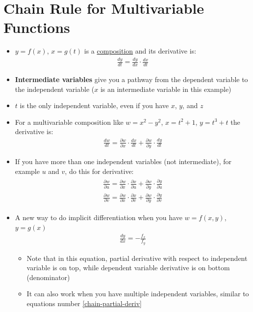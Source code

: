\documentclass{article}
\begin{document}
\section{Chain Rule for Multivariable Functions}
\begin{itemize}
  \item $y = f(x)$, $x = g(t)$ is a \underline{composition} and its derivative is:
  \begin{align}
    \frac{dy}{dt} = \frac{dy}{dx}\cdot\frac{dx}{dt}
  \end{align}
  \item \textbf{Intermediate variables} give you a pathway from the dependent variable to the independent variable ($x$ is an intermediate variable in this example)
  \item $t$ is the only independent variable, even if you have $x$, $y$, and $z$
  \item For a multivariable composition like $w = x^2 - y^2$, $x = t^2 + 1$, $y = t^3 + t$ the derivative is:
    \begin{align}
      \frac{dw}{dt} = \frac{\partial w}{\partial x}\cdot\frac{dx}{dt} + \frac{\partial w}{\partial y}\cdot\frac{dy}{dt}
    \end{align}
  \item If you have more than one independent variables (not intermediate), for example $u$ and $v$, do this for derivative:
  \begin{align}
    \begin{split}
      \frac{\partial w}{\partial u} = \frac{\partial w}{\partial x}\cdot\frac{\partial x}{\partial u} + \frac{\partial w}{\partial y}\cdot\frac{\partial y}{\partial u} \\
      \frac{\partial w}{\partial v} = \frac{\partial w}{\partial x}\cdot\frac{\partial x}{\partial v} + \frac{\partial w}{\partial y}\cdot\frac{\partial y}{\partial v}
    \end{split} \label{chain-partial-deriv}
  \end{align}
  \item A new way to do implicit differentiation when you have $w = f(x,y)$, $y = g(x)$
  \begin{align}
    \frac{dy}{dx} = -\frac{f_x}{f_y}
  \end{align}
  \begin{itemize}
    \item Note that in this equation, partial derivative with respect to independent variable is on top, while dependent variable derivative is on bottom (denominator)
    \item It can also work when you have multiple independent variables, similar to equations number \ref{chain-partial-deriv}
  \end{itemize}
\end{itemize}
\end{document}
